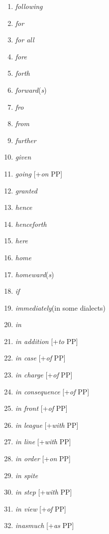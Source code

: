 \begin{multicols}{3}
\begin{enumerate}[noitemsep]
    \item \textit{following}
    \item \textit{for}
    \item \textit{for all}
    \item \textit{fore}
    \item \textit{forth}
    \item \textit{forward}(\textit{s})
    \item \textit{fro}
    \item \textit{from}
    \item \textit{further}
    \item \textit{given}
    \item \textit{going} [+\textit{on} PP]
    \item \textit{granted}
    \item \textit{hence}
    \item \textit{henceforth}
    \item \textit{here}
    \item \textit{home}
    \item \textit{homeward}(\textit{s})
    \item \textit{if}
    \item \textit{immediately}\newline(in some dialects)
    \item \textit{in}
    \item \textit{in addition} [+\textit{to} PP]
    \item \textit{in case} [+\textit{of} PP]
    \item \textit{in charge} [+\textit{of} PP]
    \item \textit{in consequence} [+\textit{of} PP]
    \item \textit{in front} [+\textit{of} PP]
    \item \textit{in league} [+\textit{with} PP]
    \item \textit{in line} [+\textit{with} PP]
    \item \textit{in order} [+\textit{on} PP]
    \item \textit{in spite}
    \item \textit{in step} [+\textit{with} PP]
    \item \textit{in view} [+\textit{of} PP]
    \item \textit{inasmuch} [+\textit{as} PP]

\end{enumerate}
\end{multicols}
